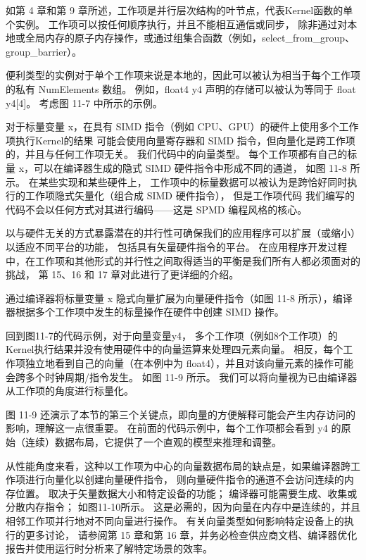 如第 4 章和第 9 章所述，工作项是并行层次结构的叶节点，代表Kernel函数的单个实例。 
工作项可以按任何顺序执行，并且不能相互通信或同步，
除非通过对本地或全局内存的原子内存操作，或通过组集合函数（例如，select\_from\_group、group\_barrier）。

便利类型的实例对于单个工作项来说是本地的，因此可以被认为相当于每个工作项的私有 NumElements 数组。 
例如，float4 y4 声明的存储可以被认为等同于 float y4[4]。 考虑图 11-7 中所示的示例。

对于标量变量 x，在具有 SIMD 指令（例如 CPU、GPU）的硬件上使用多个工作项执行Kernel的结果
可能会使用向量寄存器和 SIMD 指令，但向量化是跨工作项的，并且与任何工作项无关。 
我们代码中的向量类型。 每个工作项都有自己的标量 x，可以在编译器生成的隐式 SIMD 硬件指令中形成不同的通道，
如图 11-8 所示。 在某些实现和某些硬件上，
工作项中的标量数据可以被认为是跨恰好同时执行的工作项隐式矢量化（组合成 SIMD 硬件指令），
但是工作项代码 我们编写的代码不会以任何方式对其进行编码——这是 SPMD 编程风格的核心。

以与硬件无关的方式暴露潜在的并行性可确保我们的应用程序可以扩展（或缩小）以适应不同平台的功能，
包括具有矢量硬件指令的平台。 
在应用程序开发过程中，在工作项和其他形式的并行性之间取得适当的平衡是我们所有人都必须面对的挑战，
第 15、16 和 17 章对此进行了更详细的介绍。

通过编译器将标量变量 x 隐式向量扩展为向量硬件指令（如图 11-8 所示），编译器根据多个工作项中发生的标量操作在硬件中创建 SIMD 操作。

回到图11-7的代码示例，对于向量变量y4，
多个工作项（例如8个工作项）的Kernel执行结果并没有使用硬件中的向量运算来处理四元素向量。 
相反，每个工作项独立地看到自己的向量（在本例中为 float4），并且对该向量元素的操作可能会跨多个时钟周期/指令发生。 
如图 11-9 所示。 我们可以将向量视为已由编译器从工作项的角度进行标量化。

图 11-9 还演示了本节的第三个关键点，即向量的方便解释可能会产生内存访问的影响，理解这一点很重要。 
在前面的代码示例中，每个工作项都会看到 y4 的原始（连续）数据布局，它提供了一个直观的模型来推理和调整。

从性能角度来看，这种以工作项为中心的向量数据布局的缺点是，如果编译器跨工作项进行向量化以创建向量硬件指令，
则向量硬件指令的通道不会访问连续的内存位置。 取决于矢量数据大小和特定设备的功能； 
编译器可能需要生成、收集或分散内存指令； 
如图11-10所示。 这是必需的，因为向量在内存中是连续的，并且相邻工作项并行地对不同向量进行操作。 
有关向量类型如何影响特定设备上的执行的更多讨论，
请参阅第 15 章和第 16 章，并务必检查供应商文档、编译器优化报告并使用运行时分析来了解特定场景的效率。

